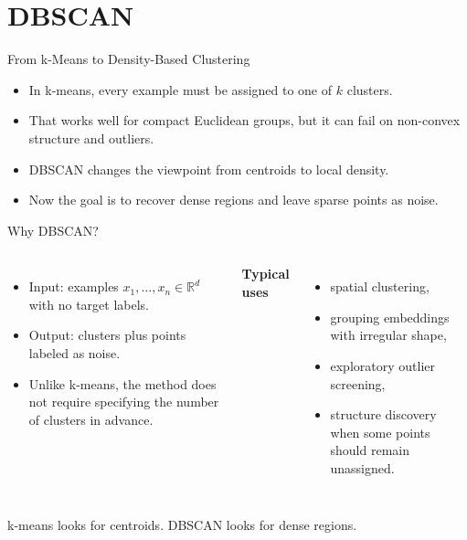 \section{DBSCAN}

\begin{frame}{From k-Means to Density-Based Clustering}
\begin{itemize}
  \item In k-means, every example must be assigned to one of $k$ clusters.
  \pause
  \item That works well for compact Euclidean groups, but it can fail on non-convex structure and outliers.
  \pause
  \item DBSCAN changes the viewpoint from centroids to local density.
  \pause
  \item Now the goal is to recover dense regions and leave sparse points as noise.
\end{itemize}
\end{frame}

\begin{frame}{Why DBSCAN?}
\begin{columns}[T]
\begin{itemize}
  \item Input: examples $x_1,\dots,x_n \in \mathbb{R}^d$ with no target labels.
  \pause
  \item Output: clusters plus points labeled as noise.
  \pause
  \item Unlike k-means, the method does not require specifying the number of clusters in advance.
\end{itemize}

\pause
{}
\textbf{Typical uses}
\begin{itemize}
  \item spatial clustering,
  \pause
  \item grouping embeddings with irregular shape,
  \pause
  \item exploratory outlier screening,
  \pause
  \item structure discovery when some points should remain unassigned.
\end{itemize}
\end{columns}

\pause
\begin{rlintuition}
k-means looks for centroids. DBSCAN looks for dense regions.
\end{rlintuition}
\end{frame}

